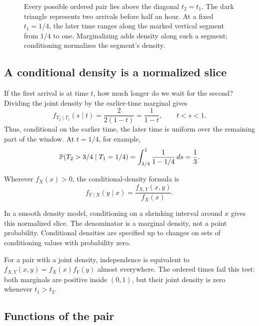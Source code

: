 \begin{figure}[htbp]
  \centering
  
  \caption{Every possible ordered pair lies above the diagonal
  \(t_2=t_1\). The dark triangle represents two arrivals before half an
  hour. At a fixed \(t_1=1/4\), the later time ranges along the marked
  vertical segment from \(1/4\) to one. Marginalizing adds density along
  such a segment; conditioning normalizes the segment's density.}
  \label{fig:joint-arrival-region}
\end{figure}

\subsection{A conditional density is a normalized slice}

If the first arrival is at time \(t\), how much longer do we wait for
the second? Dividing the joint density by the earlier-time marginal gives
\[
  f_{T_2\mid T_1}(s\mid t)
  =\frac{2}{2(1-t)}=\frac1{1-t},\qquad t<s<1.
\]
Thus, conditional on the earlier time, the later time is uniform over
the remaining part of the window. At \(t=1/4\), for example,
\[
  \mathbb{P}(T_2>3/4\mid T_1=1/4)
  =\int_{3/4}^{1}\frac{1}{1-1/4}\,ds=\frac13.
\]

\begin{definition}
Wherever \(f_X(x)>0\), the conditional-density formula is
\begin{equation}
  f_{Y\mid X}(y\mid x)=\frac{f_{X,Y}(x,y)}{f_X(x)}.
  \label{eq:joint-conditional-density}
\end{equation}
\end{definition}
In a smooth density model, conditioning on a shrinking interval around
\(x\) gives this normalized slice. The denominator is a marginal
density, not a point probability. Conditional densities are specified
up to changes on sets of conditioning values with probability zero.

For a pair with a joint density, independence is equivalent to
\(f_{X,Y}(x,y)=f_X(x)f_Y(y)\) almost everywhere. The ordered times fail
this test: both marginals are positive inside \((0,1)\), but their
joint density is zero whenever \(t_1>t_2\).

\subsection{Functions of the pair}
\label{sec:joint-expectations}

